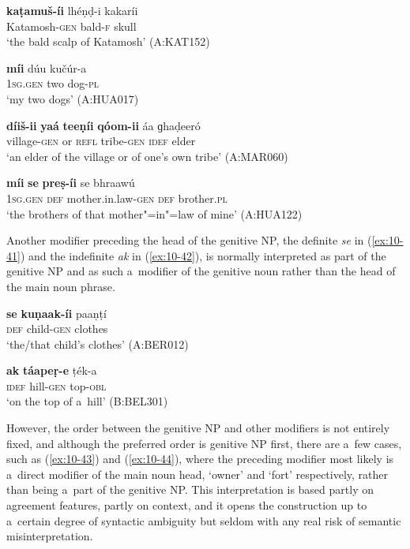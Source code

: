 \begin{exe}
\ex
\label{ex:10-37}
\gll \textbf{kaṭamuš-íi} lhéṇḍ-i kakaríi \\
Katamosh-\textsc{gen} bald-\textsc{f} skull \\
\glt `the bald scalp of Katamosh' (A:KAT152)

\ex
\label{ex:10-38}
\gll \textbf{míi} dúu kučúr-a \\
\textsc{1sg.gen} two dog-\textsc{pl}  \\
\glt `my two dogs' (A:HUA017)

\ex
\label{ex:10-39}
\gll \textbf{díiš-ii} \textbf{yaá} \textbf{teeṇíi} \textbf{qóom-ii} áa ɡhaḍeeró  \\
village-\textsc{gen} or \textsc{refl} tribe-\textsc{gen} \textsc{idef} elder \\
\glt `an elder of the village or of one's own tribe' (A:MAR060)

\ex
\label{ex:10-40}
\gll \textbf{míi} \textbf{se} \textbf{preṣ-íi} se bhraawú \\
\textsc{1sg.gen} \textsc{def} mother.in.law-\textsc{gen} \textsc{def} brother.\textsc{pl}  \\
\glt `the brothers of that mother"=in"=law of mine' (A:HUA122)
\end{exe}


Another modifier preceding the head of the genitive NP, the definite \textit{se} in (\ref{ex:10-41}) and the indefinite \textit{ak} in (\ref{ex:10-42}), is normally interpreted as part of the genitive NP and as such a~modifier of the genitive noun rather than the head of the main noun phrase.

\begin{exe}
\ex
\label{ex:10-41}
\gll \textbf{se} \textbf{kuṇaak-íi} paaṇṭí \\
\textsc{def} child-\textsc{gen} clothes  \\
\glt `the/that child's clothes' (A:BER012)

\ex
\label{ex:10-42}
\gll \textbf{ak} \textbf{táapeṛ-e} ṭék-a \\
\textsc{idef} hill-\textsc{gen} top-\textsc{obl}  \\
\glt `on the top of a~hill' (B:BEL301)
\end{exe}


However, the order between the genitive NP and other modifiers is not entirely fixed, and although the preferred order is genitive NP first, there are a~few cases, such as (\ref{ex:10-43}) and (\ref{ex:10-44}), where the preceding modifier most likely is a~direct modifier of the main noun head, `owner' and `fort' respectively, rather than being a~part of the genitive NP. This interpretation is based partly on agreement features, partly on context, and it opens the construction up to a~certain degree of syntactic ambiguity but seldom with any real risk of semantic misinterpretation.


